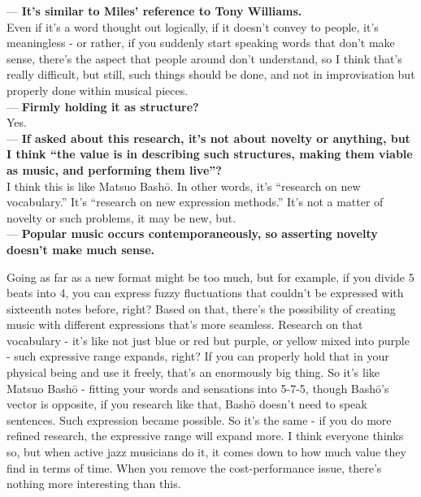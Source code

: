 \begin{description}
--- {\bf It's similar to Miles' reference to Tony Williams.}\\

Even if it's a word thought out logically, if it doesn't convey to people, it's meaningless - or rather, if you suddenly start speaking words that don't make sense, there's the aspect that people around don't understand, so I think that's really difficult, but still, such things should be done, and not in improvisation but properly done within musical pieces.\\

--- {\bf Firmly holding it as structure?}\\

Yes.\\

--- {\bf If asked about this research, it's not about novelty or anything, but I think ``the value is in describing such structures, making them viable as music, and performing them live''?}\\

I think this is like Matsuo Bashō. In other words, it's ``research on new vocabulary.'' It's ``research on new expression methods.'' It's not a matter of novelty or such problems, it may be new, but.\\

--- {\bf Popular music occurs contemporaneously, so asserting novelty doesn't make much sense.}

Going as far as a new format might be too much, but for example, if you divide 5 beats into 4, you can express fuzzy fluctuations that couldn't be expressed with sixteenth notes before, right? Based on that, there's the possibility of creating music with different expressions that's more seamless. Research on that vocabulary - it's like not just blue or red but purple, or yellow mixed into purple - such expressive range expands, right? If you can properly hold that in your physical being and use it freely, that's an enormously big thing. So it's like Matsuo Bashō - fitting your words and sensations into 5-7-5, though Bashō's vector is opposite, if you research like that, Bashō doesn't need to speak sentences. Such expression became possible. So it's the same - if you do more refined research, the expressive range will expand more. I think everyone thinks so, but when active jazz musicians do it, it comes down to how much value they find in terms of time. When you remove the cost-performance issue, there's nothing more interesting than this.
\end{description}

